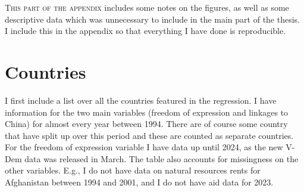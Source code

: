 \lettrine{T}{his part of the appendix} includes some notes on the figures, as well as some descriptive data which was unnecessary to include in the main part of the thesis. I include this in the appendix so that everything I have done is reproducible.

\section{Countries} \label{sec:countries}
I first include a list over all the countries featured in the regression. I have information for the two main variables (freedom of expression and linkages to China) for almost every year between 1994. There are of course some country that have split up over this period and these are counted as separate countries. For the freedom of expression variable I have data up until 2024, as the new V-Dem data \citep{coppedge_v-dem_2025} was released in March. The table also accounts for missingness on the other variables. E.g., I do not have data on natural resources rents for Afghanistan between 1994 and 2001, and I do not have aid data for 2023.



